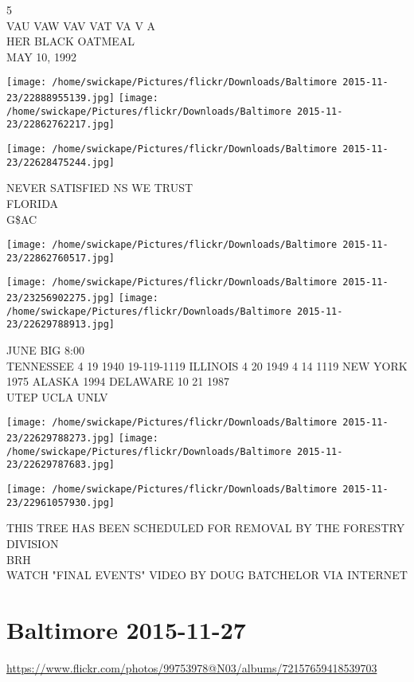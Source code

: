 \documentclass[10pt,letterpaper]{article}
\begin{document}
5\\
VAU VAW VAV VAT VA V A\\
HER BLACK OATMEAL\\
MAY 10, 1992
\pagebreak

\texttt{[image: /home/swickape/Pictures/flickr/Downloads/Baltimore 2015-11-23/22888955139.jpg]}
\texttt{[image: /home/swickape/Pictures/flickr/Downloads/Baltimore 2015-11-23/22862762217.jpg]}

\texttt{[image: /home/swickape/Pictures/flickr/Downloads/Baltimore 2015-11-23/22628475244.jpg]}

NEVER SATISFIED NS WE TRUST\\
FLORIDA\\
G\$AC
\pagebreak

\texttt{[image: /home/swickape/Pictures/flickr/Downloads/Baltimore 2015-11-23/22862760517.jpg]}

\vspace{0.25in}
\texttt{[image: /home/swickape/Pictures/flickr/Downloads/Baltimore 2015-11-23/23256902275.jpg]}
\texttt{[image: /home/swickape/Pictures/flickr/Downloads/Baltimore 2015-11-23/22629788913.jpg]}

JUNE BIG 8:00\\
TENNESSEE 4 19 1940 19{-}119{-}1119 ILLINOIS 4 20 1949 4 14 1119 NEW YORK 1975 ALASKA 1994 DELAWARE 10 21 1987\\
UTEP UCLA UNLV
\pagebreak

\texttt{[image: /home/swickape/Pictures/flickr/Downloads/Baltimore 2015-11-23/22629788273.jpg]}
\texttt{[image: /home/swickape/Pictures/flickr/Downloads/Baltimore 2015-11-23/22629787683.jpg]}

\texttt{[image: /home/swickape/Pictures/flickr/Downloads/Baltimore 2015-11-23/22961057930.jpg]}

THIS TREE HAS BEEN SCHEDULED FOR REMOVAL BY THE FORESTRY DIVISION\\
BRH\\
WATCH "FINAL EVENTS" VIDEO BY DOUG BATCHELOR VIA INTERNET
\pagebreak

\section*{Baltimore 2015-11-27}

\url{https://www.flickr.com/photos/99753978@N03/albums/72157659418539703}
\end{document}
